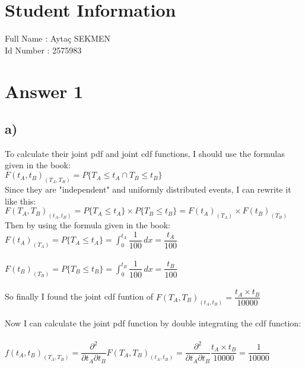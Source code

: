 \documentclass[12pt]{article}
\begin{document}
\section*{Student Information } 
Full Name :  Aytaç SEKMEN\\
Id Number :  2575983\\

\section*{Answer 1}

\subsection*{a)}
To calculate their joint pdf and joint cdf functions, I should use the formulas given in the book:\\
$F(t_A,t_B )_{(T_A, T_B)} = P \{T_A\leq t_A \cap  T_B \leq  t_B\}$\\
Since they are "independent" and uniformly distributed events, I can rewrite it like this:\\
$F(T_A,T_B )_{(t_A, t_B)} =P \{T_A\leq t_A\}\times P \{ T_B\leq  t_B\}=F(t_A)_{(T_A)}\times F(t_B)_{(T_B)}$\\
Then by using the formula given in the book:\\
$F(t_A)_{(T_A)} = P \{ T_A \leq t_A\} =\int_{0}^{t_A} \dfrac{1}{100} \,dx =\dfrac{t_A}{100}$\\~\\
$F(t_B)_{(T_B)} = P \{ T_B \leq t_B\} =\int_{0}^{t_B} \dfrac{1}{100} \,dx =\dfrac{t_B}{100} $\\~\\
So finally I found the joint cdf funtion of $F(T_A,T_B )_{(t_A, t_B)}=\dfrac{t_A\times t_B}{10000}$\\~\\
Now I can calculate the joint pdf function by double integrating the cdf function:\\~\\
$f(t_A,t_B )_{(T_A, T_B)} = \dfrac {\partial^2}{\partial t_A \partial t_B}F(T_A,T_B )_{(t_A, t_B)}=\dfrac {\partial^2}{\partial t_A \partial t_B}\dfrac{t_A\times t_B}{10000}=\dfrac{1}{10000}$\\



\end{document}
